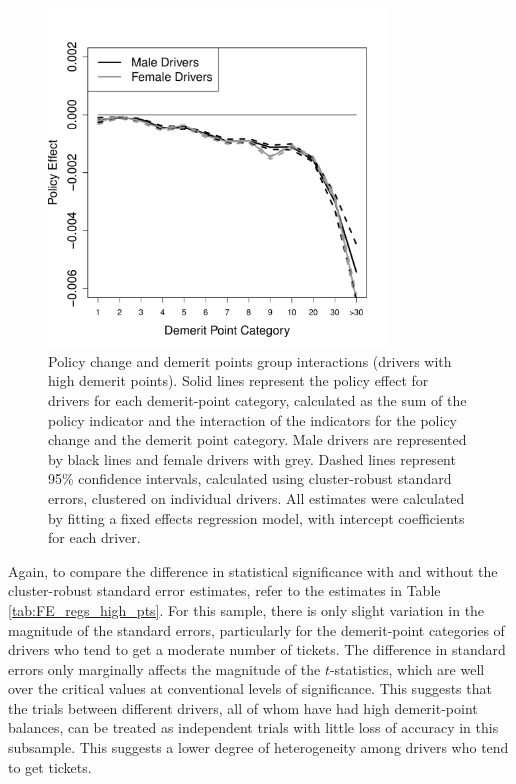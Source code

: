 \documentclass[12pt]{paper}
\begin{document}
\begin{figure}
\centering
\includegraphics[width=0.8\textwidth]{../Figures/FFX_reg_policy_points_grp_high_pts.pdf}
\caption{
Policy change and demerit points group interactions (drivers with high demerit points).
Solid lines represent the policy effect for drivers for each demerit-point category, 
calculated as the sum of the policy indicator and the interaction of the  indicators for the policy change 
and the demerit point category.  
Male drivers are represented by black lines and female drivers with grey. 
Dashed lines represent 95\% confidence intervals, 
calculated using cluster-robust standard errors, clustered on individual drivers. 
All estimates were calculated by fitting a fixed effects regression model, 
with intercept coefficients for each driver. 
}\label{fig:FE_regs_high_pts}
\end{figure}









Again, to compare the difference in statistical significance with and without 
the cluster-robust standard error estimates, 
refer to the estimates in Table \ref{tab:FE_regs_high_pts}. 
For this sample, there is only slight variation in the magnitude of the standard errors, 
particularly for the demerit-point categories of drivers who tend to get a moderate number of tickets. 
The difference in standard errors only marginally affects the magnitude of the $t$-statistics, 
which are well over the critical values at conventional levels of significance. 
This suggests that the trials between different drivers, all of whom have had high demerit-point balances, 
can be treated as independent trials with little loss of accuracy in this subsample. 
This suggests a lower degree of heterogeneity among drivers who tend to get tickets. 
\end{document}
